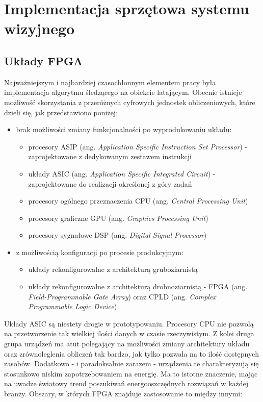 \chapter{Implementacja sprzętowa systemu wizyjnego}
\section{Układy FPGA}
Najważniejszym i najbardziej czasochłonnym elementem pracy była implementacja algorytmu śledzącego na obiekcie latającym. Obecnie istnieje możliwość skorzystania z przeróżnych cyfrowych jednostek obliczeniowych, które dzieli się, jak przedstawiono poniżej:
\begin{itemize}
	\item brak możliwości zmiany funkcjonalności po wyprodukowaniu układu:
	\begin{itemize}
		\item procesory ASIP (ang. \textit{Application Specific Instruction Set Processor}) - zaprojektowane z dedykowanym zestawem instrukcji		
		\item układy ASIC (ang. \textit{Application Specific Integrated Circuit}) - zaprojektowane do realizacji określonej z góry zadań
		\item procesory ogólnego przeznaczenia CPU (ang. \textit{Central Processing Unit})
		\item procesory graficzne GPU (ang. \textit{Graphics Processing Unit})
		\item procesory sygnałowe DSP (ang. \textit{Digital Signal Processor})
	\end{itemize}
	\item z możliwością konfiguracji po procesie produkcyjnym:
	\begin{itemize} 
		\item układy rekonfigurowalne z architekturą gruboziarnistą
		\item układy rekonfigurowalne z architekturą drobnoziarnistą - FPGA (ang. \textit{Field-Programmable Gate Array}) oraz CPLD (ang. \textit{Complex Programmable Logic Device})
	\end{itemize}
\end{itemize}
Układy ASIC są niestety drogie w prototypowaniu. Procesory CPU nie pozwolą na przetworzenie tak wielkiej ilości danych w czasie rzeczywistym. Z kolei druga grupa urządzeń ma atut polegający na możliwości zmiany architektury układu oraz zrównoleglenia obliczeń tak bardzo, jak tylko pozwala na to ilość dostępnych zasobów. Dodatkowo - i paradoksalnie zarazem - urządzenia te charakteryzują się stosunkowo niskim zapotrzebowaniem na energię. Ma to istotne znaczenie, mając na uwadze światowy trend poszukiwań energooszczędnych rozwiązań w każdej branży. Obszary, w których FPGA znajduje zastosowanie to między innymi:
